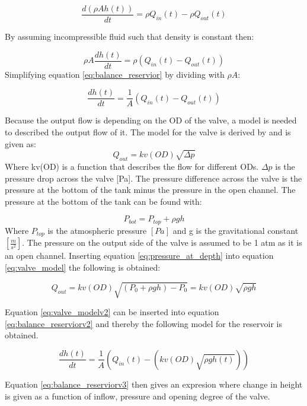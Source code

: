 \begin{equation}
		\frac{d(\rho Ah(t))}{dt}=\rho Q_{in}(t)-\rho Q_{out}(t)
\end{equation}

By assuming incompressible fluid such that density is constant then:

\begin{equation}\label{eq:balance_reservior}
	\rho A\frac{dh(t)}{dt}=\rho \left(Q_{in}(t)-Q_{out}(t)\right)
\end{equation}
Simplifying equation \ref{eq:balance_reservior} by dividing with $\rho A$:

\begin{equation}\label{eq:balance_reserviorv2}
	\frac{dh(t)}{dt}=\frac{1}{A} \left(Q_{in}(t)-Q_{out}(t)\right)
\end{equation}

Because the output flow is depending on the OD of the valve, a model is needed to described the output flow of it. The model for the valve is derived by \cite{boysen} and is given as:
\begin{equation}\label{eq:valve_model}
	Q_{out} = kv(OD) \sqrt{\Delta p}
\end{equation}
Where kv(OD) is a function that describes the flow for different ODs. $\Delta p$ is the pressure drop across the valve [Pa]. The pressure difference across the valve is the pressure at the bottom of the tank minus the pressure in the open channel. The pressure at the bottom of the tank can be found with:

\begin{equation}\label{eq:pressure_at_depth}
 	P_{bot} = P_{top} +\rho g h
 \end{equation} 
 Where $P_{top}$ is the atmospheric pressure $[Pa]$ and g is the gravitational constant $\left[\frac{m}{s^2}\right]$. The pressure on the output side of the valve is assumed to be 1 atm as it is an open channel. Inserting equation \ref{eq:pressure_at_depth} into equation \ref{eq:valve_model} the following is obtained:    


\begin{equation}\label{eq:valve_modelv2}
	Q_{out} = kv(OD) \sqrt{(P_0 +\rho g h)- P_0} = kv(OD) \sqrt{\rho g h} 
\end{equation}

Equation \ref{eq:valve_modelv2} can be inserted into equation \ref{eq:balance_reserviorv2} and thereby the following model for the reservoir is obtained.

\begin{equation}\label{eq:balance_reserviorv3}
	\frac{dh(t)}{dt}=\frac{1}{A} \left(Q_{in}(t)-\left(kv(OD) \sqrt{\rho g h(t)}\right)\right)
\end{equation}

Equation \ref{eq:balance_reserviorv3} then gives an expresion where change in height is given as a function of inflow, pressure and opening degree of the valve. 